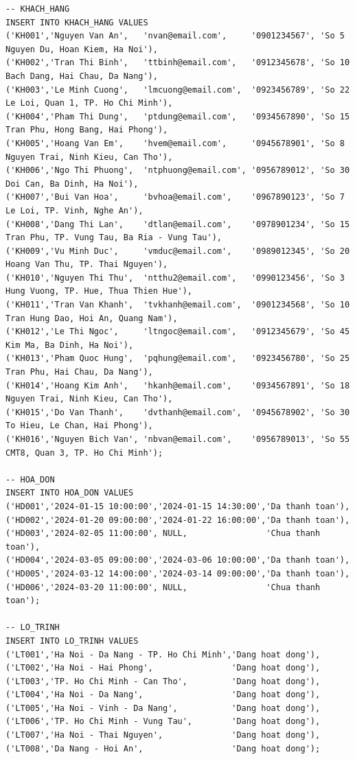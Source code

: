 \documentclass[11pt]{report}
\begin{document}
\begin{verbatim}
-- KHACH_HANG
INSERT INTO KHACH_HANG VALUES
('KH001','Nguyen Van An',   'nvan@email.com',     '0901234567', 'So 5 Nguyen Du, Hoan Kiem, Ha Noi'),
('KH002','Tran Thi Binh',   'ttbinh@email.com',   '0912345678', 'So 10 Bach Dang, Hai Chau, Da Nang'),
('KH003','Le Minh Cuong',   'lmcuong@email.com',  '0923456789', 'So 22 Le Loi, Quan 1, TP. Ho Chi Minh'),
('KH004','Pham Thi Dung',   'ptdung@email.com',   '0934567890', 'So 15 Tran Phu, Hong Bang, Hai Phong'),
('KH005','Hoang Van Em',    'hvem@email.com',     '0945678901', 'So 8 Nguyen Trai, Ninh Kieu, Can Tho'),
('KH006','Ngo Thi Phuong',  'ntphuong@email.com', '0956789012', 'So 30 Doi Can, Ba Dinh, Ha Noi'),
('KH007','Bui Van Hoa',     'bvhoa@email.com',    '0967890123', 'So 7 Le Loi, TP. Vinh, Nghe An'),
('KH008','Dang Thi Lan',    'dtlan@email.com',    '0978901234', 'So 15 Tran Phu, TP. Vung Tau, Ba Ria - Vung Tau'),
('KH009','Vu Minh Duc',     'vmduc@email.com',    '0989012345', 'So 20 Hoang Van Thu, TP. Thai Nguyen'),
('KH010','Nguyen Thi Thu',  'ntthu2@email.com',   '0990123456', 'So 3 Hung Vuong, TP. Hue, Thua Thien Hue'),
('KH011','Tran Van Khanh',  'tvkhanh@email.com',  '0901234568', 'So 10 Tran Hung Dao, Hoi An, Quang Nam'),
('KH012','Le Thi Ngoc',     'ltngoc@email.com',   '0912345679', 'So 45 Kim Ma, Ba Dinh, Ha Noi'),
('KH013','Pham Quoc Hung',  'pqhung@email.com',   '0923456780', 'So 25 Tran Phu, Hai Chau, Da Nang'),
('KH014','Hoang Kim Anh',   'hkanh@email.com',    '0934567891', 'So 18 Nguyen Trai, Ninh Kieu, Can Tho'),
('KH015','Do Van Thanh',    'dvthanh@email.com',  '0945678902', 'So 30 To Hieu, Le Chan, Hai Phong'),
('KH016','Nguyen Bich Van', 'nbvan@email.com',    '0956789013', 'So 55 CMT8, Quan 3, TP. Ho Chi Minh');

-- HOA_DON
INSERT INTO HOA_DON VALUES
('HD001','2024-01-15 10:00:00','2024-01-15 14:30:00','Da thanh toan'),
('HD002','2024-01-20 09:00:00','2024-01-22 16:00:00','Da thanh toan'),
('HD003','2024-02-05 11:00:00', NULL,                'Chua thanh toan'),
('HD004','2024-03-05 09:00:00','2024-03-06 10:00:00','Da thanh toan'),
('HD005','2024-03-12 14:00:00','2024-03-14 09:00:00','Da thanh toan'),
('HD006','2024-03-20 11:00:00', NULL,                'Chua thanh toan');

-- LO_TRINH
INSERT INTO LO_TRINH VALUES
('LT001','Ha Noi - Da Nang - TP. Ho Chi Minh','Dang hoat dong'),
('LT002','Ha Noi - Hai Phong',                'Dang hoat dong'),
('LT003','TP. Ho Chi Minh - Can Tho',         'Dang hoat dong'),
('LT004','Ha Noi - Da Nang',                  'Dang hoat dong'),
('LT005','Ha Noi - Vinh - Da Nang',           'Dang hoat dong'),
('LT006','TP. Ho Chi Minh - Vung Tau',        'Dang hoat dong'),
('LT007','Ha Noi - Thai Nguyen',              'Dang hoat dong'),
('LT008','Da Nang - Hoi An',                  'Dang hoat dong');


\end{verbatim}
\end{document}

